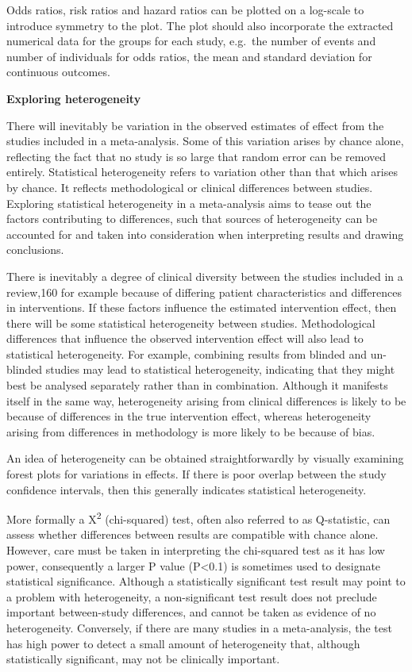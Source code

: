\documentclass[
  11pt,
  a4paper,
  DIV=11,
  numbers=noendperiod]{scrreprt}
\begin{document}
Odds ratios, risk ratios and hazard ratios can be plotted on a log-scale
to introduce symmetry to the plot. The plot should also incorporate the
extracted numerical data for the groups for each study, e.g.~the number
of events and number of individuals for odds ratios, the mean and
standard deviation for continuous outcomes.

\textbf{Exploring heterogeneity}

There will inevitably be variation in the observed estimates of effect
from the studies included in a meta-analysis. Some of this variation
arises by chance alone, reflecting the fact that no study is so large
that random error can be removed entirely. Statistical heterogeneity
refers to variation other than that which arises by chance. It reflects
methodological or clinical differences between studies. Exploring
statistical heterogeneity in a meta-analysis aims to tease out the
factors contributing to differences, such that sources of heterogeneity
can be accounted for and taken into consideration when interpreting
results and drawing conclusions.

There is inevitably a degree of clinical diversity between the studies
included in a review,160 for example because of differing patient
characteristics and differences in interventions. If these factors
influence the estimated intervention effect, then there will be some
statistical heterogeneity between studies. Methodological differences
that influence the observed intervention effect will also lead to
statistical heterogeneity. For example, combining results from blinded
and un-blinded studies may lead to statistical heterogeneity, indicating
that they might best be analysed separately rather than in combination.
Although it manifests itself in the same way, heterogeneity arising from
clinical differences is likely to be because of differences in the true
intervention effect, whereas heterogeneity arising from differences in
methodology is more likely to be because of bias.

An idea of heterogeneity can be obtained straightforwardly by visually
examining forest plots for variations in effects. If there is poor
overlap between the study confidence intervals, then this generally
indicates statistical heterogeneity.

More formally a X\textsuperscript{2} (chi-squared) test, often also
referred to as Q-statistic, can assess whether differences between
results are compatible with chance alone. However, care must be taken in
interpreting the chi-squared test as it has low power, consequently a
larger P value (P\textless0.1) is sometimes used to designate
statistical significance. Although a statistically significant test
result may point to a problem with heterogeneity, a non-significant test
result does not preclude important between-study differences, and cannot
be taken as evidence of no heterogeneity. Conversely, if there are many
studies in a meta-analysis, the test has high power to detect a small
amount of heterogeneity that, although statistically significant, may
not be clinically important.
\end{document}
